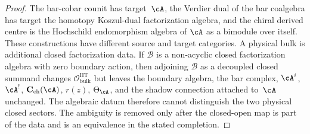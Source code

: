 \begin{proof}
The bar-cobar counit has target~$\cA$, the Verdier dual of the bar
coalgebra has target the homotopy Koszul-dual factorization algebra,
and the chiral derived centre is the Hochschild endomorphism algebra of
$\cA$ as a bimodule over itself. These constructions have different
source and target categories. A physical bulk is additional closed
factorization data. If $\mathcal{B}$ is a non-acyclic closed
factorization algebra with zero boundary action, then adjoining
$\mathcal{B}$ as a decoupled closed summand changes
$\mathcal{O}^{\mathrm{HT}}_{\mathrm{bulk}}$ but leaves the boundary
algebra, the bar complex, $\cA^i$, $\cA^!$,
$\mathbf{C}_{\mathrm{ch}}(\cA)$, $r(z)$, $\Theta_\cA$, and the shadow
connection attached to~$\cA$ unchanged. The algebraic datum therefore
cannot distinguish the two physical closed sectors. The ambiguity is
removed only after the closed-open map is part of the data and is an
equivalence in the stated completion.
\end{proof}


